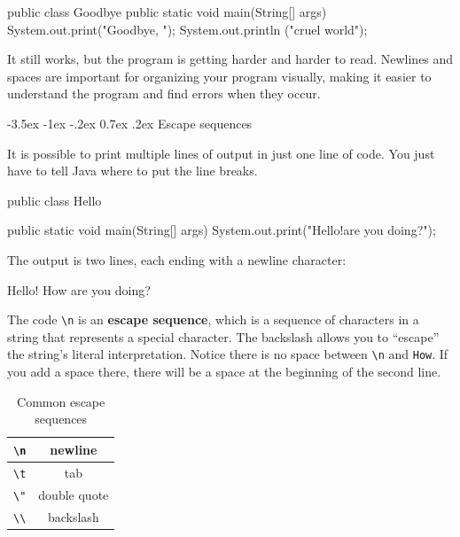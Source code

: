 \documentclass[12pt]{book}
\makeatletter
\theoremstyle{exercise}
\renewcommand{\section}{\@startsection{section}{1}{\z@}%
    {-3.5ex \@plus -1ex \@minus -.2ex}%
    {0.7ex \@plus.2ex}%
    {\normalfont\Large\bfseries}}
\makeatother
\begin{document}
\begin{code}
public class Goodbye { public static void main(String[] args) {
System.out.print("Goodbye, "); System.out.println
("cruel world");}}
\end{code}

It still works, but the program is getting harder and harder to read.
Newlines and spaces are important for organizing your program visually, making it easier to understand the program and find errors when they occur.

\section{Escape sequences}

It is possible to print multiple lines of output in just one line of code.
You just have to tell Java where to put the line breaks.

\begin{code}
public class Hello {

    public static void main(String[] args) {
        System.out.print("Hello!\nHow are you doing?\n");
    }

}
\end{code}

The output is two lines, each ending with a newline character:

\begin{stdout}
Hello!
How are you doing?
\end{stdout}


The code \verb"\n" is an {\bf escape sequence}, which is a sequence of characters in a string that represents a special character.
The backslash allows you to ``escape'' the string's literal interpretation.
Notice there is no space between \verb"\n" and \verb"How".
If you add a space there, there will be a space at the beginning of the second line.

\begin{table}[!h]
\begin{center}
\begin{tabular}{|c|c|}
\hline
\verb"\n" & newline \\
\hline
\verb"\t" & tab \\
\hline
\verb'\"' & double quote \\
\hline
\verb"\\" & backslash \\
\hline
\end{tabular}
\caption{Common escape sequences}
\end{center}
\end{table}
\end{document}
